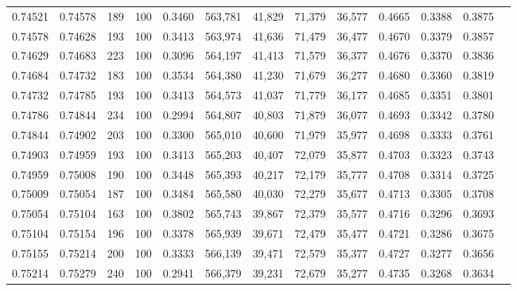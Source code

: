\begin{tabular}{rrrrrrrrrrrrr}
0.74521 & 0.74578 &   189 & 100 &                                     0.3460 & 563,781 &  41,829 &  71,379 &  36,577 & 0.4665 & 0.3388 & 0.3875 \\
0.74578 & 0.74628 &   193 & 100 &                                     0.3413 & 563,974 &  41,636 &  71,479 &  36,477 & 0.4670 & 0.3379 & 0.3857 \\
0.74629 & 0.74683 &   223 & 100 &                                     0.3096 & 564,197 &  41,413 &  71,579 &  36,377 & 0.4676 & 0.3370 & 0.3836 \\
0.74684 & 0.74732 &   183 & 100 &                                     0.3534 & 564,380 &  41,230 &  71,679 &  36,277 & 0.4680 & 0.3360 & 0.3819 \\
0.74732 & 0.74785 &   193 & 100 &                                     0.3413 & 564,573 &  41,037 &  71,779 &  36,177 & 0.4685 & 0.3351 & 0.3801 \\
0.74786 & 0.74844 &   234 & 100 &                                     0.2994 & 564,807 &  40,803 &  71,879 &  36,077 & 0.4693 & 0.3342 & 0.3780 \\
0.74844 & 0.74902 &   203 & 100 &                                     0.3300 & 565,010 &  40,600 &  71,979 &  35,977 & 0.4698 & 0.3333 & 0.3761 \\
0.74903 & 0.74959 &   193 & 100 &                                     0.3413 & 565,203 &  40,407 &  72,079 &  35,877 & 0.4703 & 0.3323 & 0.3743 \\
0.74959 & 0.75008 &   190 & 100 &                                     0.3448 & 565,393 &  40,217 &  72,179 &  35,777 & 0.4708 & 0.3314 & 0.3725 \\
0.75009 & 0.75054 &   187 & 100 &                                     0.3484 & 565,580 &  40,030 &  72,279 &  35,677 & 0.4713 & 0.3305 & 0.3708 \\
0.75054 & 0.75104 &   163 & 100 &                                     0.3802 & 565,743 &  39,867 &  72,379 &  35,577 & 0.4716 & 0.3296 & 0.3693 \\
0.75104 & 0.75154 &   196 & 100 &                                     0.3378 & 565,939 &  39,671 &  72,479 &  35,477 & 0.4721 & 0.3286 & 0.3675 \\
0.75155 & 0.75214 &   200 & 100 &                                     0.3333 & 566,139 &  39,471 &  72,579 &  35,377 & 0.4727 & 0.3277 & 0.3656 \\
0.75214 & 0.75279 &   240 & 100 &                                     0.2941 & 566,379 &  39,231 &  72,679 &  35,277 & 0.4735 & 0.3268 & 0.3634 \\

\end{tabular}
